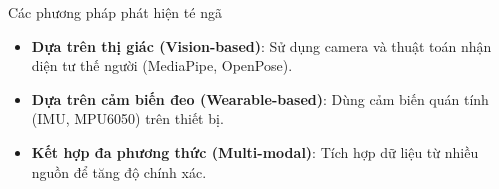 \begin{frame}{Các phương pháp phát hiện té ngã}
    \begin{itemize}
        \item \textbf{Dựa trên thị giác (Vision-based)}: Sử dụng camera và thuật toán nhận diện tư thế người (MediaPipe, OpenPose).
        \item \textbf{Dựa trên cảm biến đeo (Wearable-based)}: Dùng cảm biến quán tính (IMU, MPU6050) trên thiết bị.
        \item \textbf{Kết hợp đa phương thức (Multi-modal)}: Tích hợp dữ liệu từ nhiều nguồn để tăng độ chính xác.
    \end{itemize}
\end{frame}
